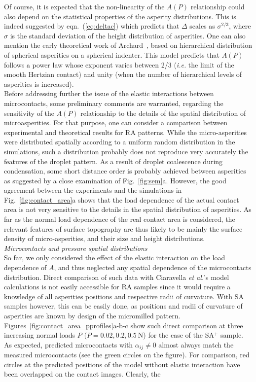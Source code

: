 \documentclass[pre,groupedaddress,showkeys,showpacs,twocolumn]{revtex4}
\begin{document}
Of course, it is expected that the non-linearity of the $A(P)$ relationship could also depend on the statistical properties of the asperity distributions. This is indeed suggested by eqn.~(\ref{eq:deltac}) which predicts that $\Delta$ scales as $\sigma^{2/3}$, where $\sigma$ is the standard deviation of the height distribution of asperities. One can also mention the early theoretical work of Archard~\cite{archard1957}, based on hierarchical distribution of spherical asperities on a spherical indenter. This model predicts that $A(P)$ follows a power law whose exponent varies between 2/3 (\textit{i.e.} the limit of the smooth Hertzian contact) and unity (when the number of hierarchical levels of asperities is increased).\\
%
Before addressing further the issue of the elastic interactions between microcontacts, some preliminary comments are warranted, regarding the sensitivity of the $A(P)$ relationship to the details of the spatial distribution of microasperities. For that purpose, one can consider a comparison between experimental and theoretical results for RA patterns. While the micro-asperities were distributed spatially according to a uniform random distribution in the simulations, such a distribution probably does not reproduce very accurately the features of the droplet pattern. As a result of droplet coalescence during condensation, some short distance order is probably achieved between asperities as suggested by a close examination of Fig.~\ref{fig:sem}a. However, the good agreement between the experiments and the simulations in Fig.~\ref{fig:contact_area}a shows that the load dependence of the actual contact area is not very sensitive to the details in the spatial distribution of asperities. As far as the normal load 
dependence of the real contact area is considered, the relevant features of surface topography are thus likely to be mainly the surface density of micro-asperities, and their size and height distributions.\\
%
\textit{Microcontacts and pressure spatial distributions}\\
%
\indent So far, we only considered the effect of the elastic interaction on the load dependence of $A$, and thus neglected any spatial dependence of the microcontacts distribution. Direct comparison of such data with Ciaravella \textit{et al.}'s model calculations is not easily accessible for RA samples since it would require a knowledge of all asperities positions and respective radii of curvature. With SA samples however, this can be easily done, as positions and radii of curvature of asperities are known by design of the micromilled pattern. Figures~\ref{fig:contact_area_pprofiles}a-b-c show such direct comparison at three increasing normal loads $P$ ($P=0.02, 0.2, 0.5~$N) for the case of the SA$^+$ sample. As expected, predicted microcontacts with $\alpha_{ij} \neq 0$ almost always match the measured microcontacts (see the green circles on the figure). For comparison, red circles at the predicted positions of the model without elastic interaction have been overlapped on the contact images. Clearly, the 
\end{document}
